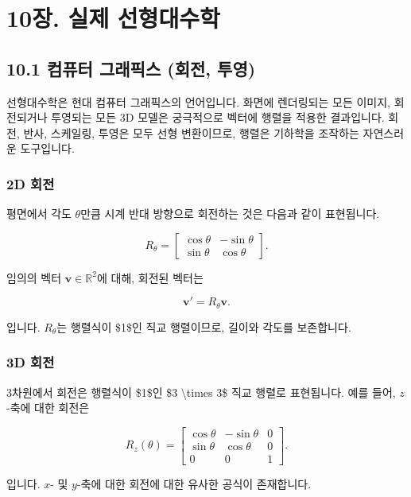 \documentclass[
  12pt,
  a4paper,
]{article}
\let\oldsection\section
\renewcommand{\section}{\clearpage\oldsection}
\begin{document}
\section{10장. 실제 선형대수학}\label{chapter-10-linear-algebra-in-practice}

\subsection{10.1 컴퓨터 그래픽스 (회전, 투영)}\label{101-computer-graphics-rotations-projections}

선형대수학은 현대 컴퓨터 그래픽스의 언어입니다. 화면에 렌더링되는 모든 이미지, 회전되거나 투영되는 모든 3D 모델은 궁극적으로 벡터에 행렬을 적용한 결과입니다. 회전, 반사, 스케일링, 투영은 모두 선형 변환이므로, 행렬은 기하학을 조작하는 자연스러운 도구입니다.

\subsubsection{2D 회전}\label{rotations-in-2d}

평면에서 각도 \(\theta\)만큼 시계 반대 방향으로 회전하는 것은 다음과 같이 표현됩니다.

\[R_\theta =
\begin{bmatrix}
\cos\theta & -\sin\theta \\
\sin\theta & \cos\theta
\end{bmatrix}.\]

임의의 벡터 \(\mathbf{v} \in \mathbb{R}^2\)에 대해, 회전된 벡터는

\[\mathbf{v}' = R_\theta \mathbf{v}.\]

입니다. \(R_\theta\)는 행렬식이 \$1\$인 직교 행렬이므로, 길이와 각도를 보존합니다.

\subsubsection{3D 회전}\label{rotations-in-3d}

3차원에서 회전은 행렬식이 \$1\$인 \$3 \textbackslash times 3\$ 직교 행렬로 표현됩니다. 예를 들어, \(z\)-축에 대한 회전은

\[R_z(\theta) =
\begin{bmatrix}
\cos\theta & -\sin\theta & 0 \\
\sin\theta & \cos\theta & 0 \\
0 & 0 & 1
\end{bmatrix}.\]

입니다. \(x\)- 및 \(y\)-축에 대한 회전에 대한 유사한 공식이 존재합니다.
\end{document}
